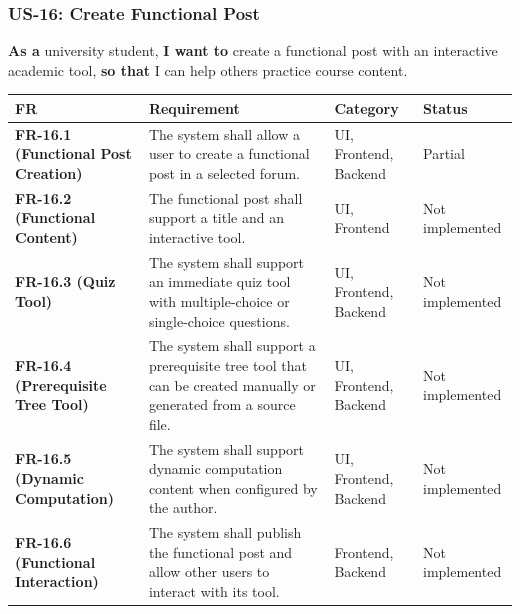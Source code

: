 \documentclass[12pt]{article}
\renewcommand{\baselinestretch}{1.5}
\begin{document}
\hypertarget{sec:us-16-create-functional-post}{}
\subsubsection*{US-16: Create Functional Post}
\par\medskip

\textbf{As a} university student, \textbf{I want to} create a functional post with an interactive academic tool, \textbf{so that} I can help others practice course content.
\par\medskip

\begingroup
\small
\renewcommand{\baselinestretch}{1.0}\selectfont
\renewcommand{\arraystretch}{1.15}
\setlength{\tabcolsep}{6pt}
\begin{longtable}{|>{\raggedright\arraybackslash}p{}|>{\raggedright\arraybackslash}p{}|>{\raggedright\arraybackslash}p{}|>{\raggedright\arraybackslash}p{}|}
\hline
\textbf{FR} & \textbf{Requirement} & \textbf{Category} & \textbf{Status} \\ \hline
\endhead
\textbf{FR-16.1 (Functional Post Creation)} & The system shall allow a user to create a functional post in a selected forum. & UI, Frontend, Backend & Partial \\ \hline
\textbf{FR-16.2 (Functional Content)} & The functional post shall support a title and an interactive tool. & UI, Frontend & Not implemented \\ \hline
\textbf{FR-16.3 (Quiz Tool)} & The system shall support an immediate quiz tool with multiple-choice or single-choice questions. & UI, Frontend, Backend & Not implemented \\ \hline
\textbf{FR-16.4 (Prerequisite Tree Tool)} & The system shall support a prerequisite tree tool that can be created manually or generated from a source file. & UI, Frontend, Backend & Not implemented \\ \hline
\textbf{FR-16.5 (Dynamic Computation)} & The system shall support dynamic computation content when configured by the author. & UI, Frontend, Backend & Not implemented \\ \hline
\textbf{FR-16.6 (Functional Interaction)} & The system shall publish the functional post and allow other users to interact with its tool. & Frontend, Backend & Not implemented \\ \hline
\end{longtable}
\endgroup
\par\medskip
\end{document}
